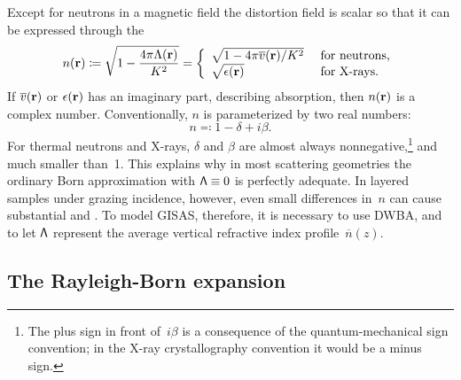 Except for neutrons in a magnetic field
the distortion field is scalar so
that it can be expressed through the 
%
%
%
\begin{equation}\label{EnkK}
  n(\mathbf{r})
  \coloneqq\sqrt{1-\frac{4\pi\Lambda(\mathbf{r})}{K^2}}
  = \left\{\begin{array}{ll}
       \sqrt{1-4\pi\overline{v}(\mathbf{r})/K^2} &\text{ for neutrons,}\\
       \sqrt{\epsilon(\mathbf{r})} &\text{ for X-rays.}
    \end{array}\right.
\end{equation}
If $\overline{v}(\mathbf{r})$ or $\epsilon(\mathbf{r})$ has an imaginary part, describing absorption,
%
then $n(\mathbf{r})$ is a complex number.
Conventionally, $n$ is parameterized by two real numbers:
\begin{equation}\label{Endb1}
  n \eqqcolon  1-\delta +i\beta.
\end{equation}
%
%
For thermal neutrons and X-rays,
$\delta$ and $\beta$ are almost always nonnegative,\footnote
{The plus sign in front of~$i\beta$ is a consequence of
the quantum-mechanical sign convention;
in the X-ray crystallography convention it would be a minus sign.
%
}
and much smaller than~1.
This explains why in most scattering geometries
%
the ordinary Born approximation
%
with $\mathsf{\Lambda}\equiv0$ is perfectly adequate.
In layered samples under grazing incidence,
%
however, even small differences in~$n$ can cause substantial
 and .
%
%
To model GISAS, therefore,
it is necessary to use DWBA,
%
and to let $\mathsf{\Lambda}$ represent
the average vertical refractive index profile~$\overline{n}(z)$.
%

\subsection{The Rayleigh-Born expansion}\label{SBornExpans}

